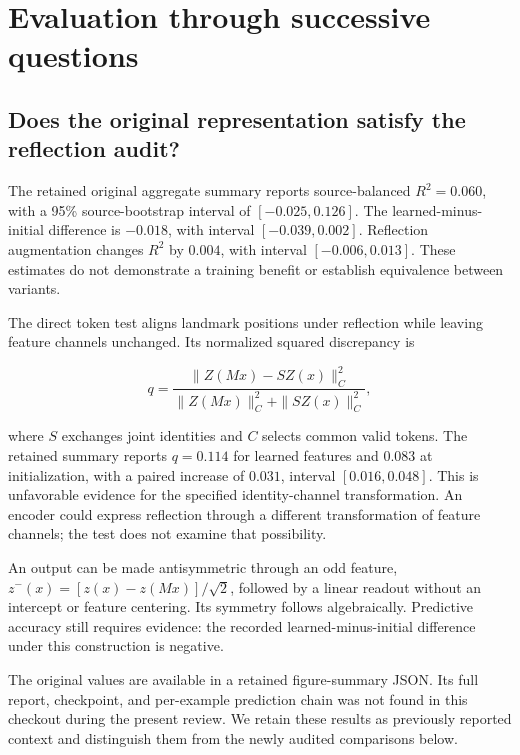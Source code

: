 \documentclass{article}
\begin{document}
\section{Evaluation through successive questions}\label{evaluation-through-successive-questions}

\subsection{Does the original representation satisfy the reflection audit?}\label{does-the-original-representation-satisfy-the-reflection-audit}

The retained original aggregate summary reports source-balanced \(R^2=0.060\), with a 95\% source-bootstrap interval of \([-0.025,0.126]\). The learned-minus-initial difference is \(-0.018\), with interval \([-0.039,0.002]\). Reflection augmentation changes \(R^2\) by \(0.004\), with interval \([-0.006,0.013]\). These estimates do not demonstrate a training benefit or establish equivalence between variants.

The direct token test aligns landmark positions under reflection while leaving feature channels unchanged. Its normalized squared discrepancy is

\[
q=\frac{\|Z(Mx)-SZ(x)\|_C^2}
{\|Z(Mx)\|_C^2+\|SZ(x)\|_C^2},
\]

where \(S\) exchanges joint identities and \(C\) selects common valid tokens. The retained summary reports \(q=0.114\) for learned features and \(0.083\) at initialization, with a paired increase of \(0.031\), interval \([0.016,0.048]\). This is unfavorable evidence for the specified identity-channel transformation. An encoder could express reflection through a different transformation of feature channels; the test does not examine that possibility.

An output can be made antisymmetric through an odd feature, \(z^-(x)=[z(x)-z(Mx)]/\sqrt{2}\), followed by a linear readout without an intercept or feature centering. Its symmetry follows algebraically. Predictive accuracy still requires evidence: the recorded learned-minus-initial difference under this construction is negative.

The original values are available in a retained figure-summary JSON. Its full report, checkpoint, and per-example prediction chain was not found in this checkout during the present review. We retain these results as previously reported context and distinguish them from the newly audited comparisons below.
\end{document}
